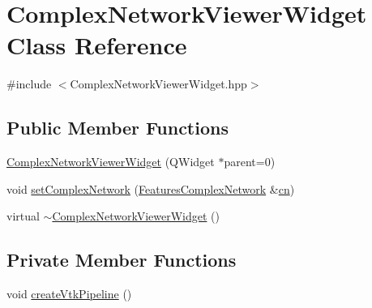 \hypertarget{class_complex_network_viewer_widget}{\section{Complex\+Network\+Viewer\+Widget Class Reference}
\label{class_complex_network_viewer_widget}
}


{\ttfamily \#include $<$Complex\+Network\+Viewer\+Widget.\+hpp$>$}

\subsection*{Public Member Functions}
\begin{DoxyCompactItemize}
\item 
\hyperlink{class_complex_network_viewer_widget_ae7e02bf71c0236ba409e32dd5ef662d9}{Complex\+Network\+Viewer\+Widget} (Q\+Widget $\ast$parent=0)
\item 
void \hyperlink{class_complex_network_viewer_widget_aed1e7ad3c16aaf0d744a6eee287e94b8}{set\+Complex\+Network} (\hyperlink{class_features_complex_network}{Features\+Complex\+Network} \&\hyperlink{class_complex_network_viewer_widget_a589b99afee6ab49d60e94922546c38fc}{cn})
\item 
virtual \hyperlink{class_complex_network_viewer_widget_a93e1496e8c5f5cd7e7e12243fdf14103}{$\sim$\+Complex\+Network\+Viewer\+Widget} ()
\end{DoxyCompactItemize}
\subsection*{Private Member Functions}
\begin{DoxyCompactItemize}
\item 
void \hyperlink{class_complex_network_viewer_widget_a7c6835fe215bf07b7586fe1f328ec0e5}{create\+Vtk\+Pipeline} ()
\end{DoxyCompactItemize}
